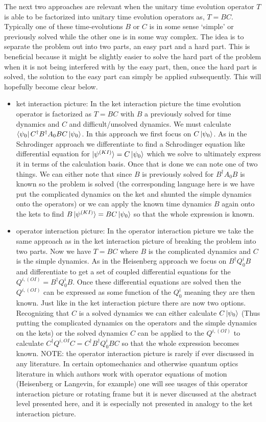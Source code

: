 \documentclass[12pt]{article}
\begin{document}
The next two approaches are relevant when the unitary time evolution operator $T$ is able to be factorized into unitary time evolution operators as, $T=BC$. 
Typically one of these time-evolutions $B$ or $C$ is in some sense `simple' or previously solved while the other one is in some way complex. 
The idea is to separate the problem out into two parts, an easy part and a hard part.
This is beneficial because it might be slightly easier to solve the hard part of the problem when it is not being interfered with by the easy part, then, once the hard part is solved, the solution to the easy part can simply be applied subsequently. 
This will hopefully become clear below.

\begin{itemize}
\item{ket interaction picture: In the ket interaction picture the time evolution operator is factorized as $T=BC$ with $B$ a previously solved for time dynamics and $C$ and difficult/unsolved dynamics. We must calculate $\bra{\psi_0}C^{\dag}B^{\dag}A_0BC\ket{\psi_0}$. In this approach we first focus on $C\ket{\psi_0}$. As in the Schrodinger approach we differentiate to find a Schrodinger equation like differential equation for $\ket{\psi^{(KI)}} = C\ket{\psi_0}$ which we solve to ultimately express it in terms of the calculation basis. Once that is done we can note one of two things. We can either note that since $B$ is previously solved for $B^{\dag}A_0B$ is known so the problem is solved (the corresponding language here is we have put the complicated dynamics on the ket and shunted the simple dynamics onto the operators) or we can apply the known time dynamics $B$ again onto the kets to find $B\ket{\psi^{(KI)}} = BC\ket{\psi_0}$ so that the whole expression is known.}
\item{operator interaction picture: In the operator interaction picture we take the same approach as in the ket interaction picture of breaking the problem into two parts. Now we have $T=BC$ where $B$ is the complicated dynamics and $C$ is the simple dynamics. As in the Heisenberg approach we focus on $B^{\dag}Q^i_0B$ and differentiate to get a set of coupled differential equations for the $Q^{i, (OI)} = B^{\dag}Q^i_0B$. Once these differential equations are solved then the $Q^{i, (OI)}$ can be expressed as some function of the $Q^i_0$ meaning they are then known. Just like in the ket interaction picture there are now two options. Recognizing that $C$ is a solved dynamics we can either calculate $C\ket{\psi_0}$ (Thus putting the complicated dynamics on the operators and the simple dynamics on the kets) or the solved dynamics $C$ can be applied to the $Q^{i, (OI)}$ to calculate $C^{\dag}Q^{i, OI}C = C^{\dag}B^{\dag}Q^i_0BC$ so that the whole expression becomes known. NOTE: the operator interaction picture is rarely if ever discussed in any literature. In certain optomechanics and otherwise quantum optics literature in which authors work with operator equations of motion (Heisenberg or Langevin, for example) one will see usages of this operator interaction picture or rotating frame but it is never discussed at the abstract level presented here, and it is especially not presented in analogy to the ket interaction picture.}
\end{itemize}
\end{document}
